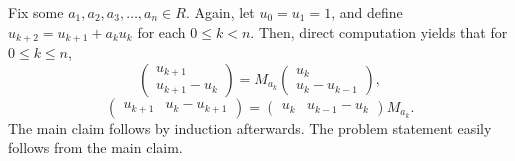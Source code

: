 \documentclass{article}
\begin{document}
Fix some $a_1, a_2, a_3, \ldots, a_n \in R$.
Again, let $u_0 = u_1 = 1$, and define $u_{k + 2} = u_{k + 1} + a_k u_k$ for each $0 \leq k < n$.
Then, direct computation yields that for $0 \leq k \leq n$,
\[ \begin{pmatrix} u_{k + 1} \\ u_{k + 1} - u_k \end{pmatrix} = M_{a_k} \begin{pmatrix} u_k \\ u_k - u_{k - 1} \end{pmatrix}, \]
\[ \begin{pmatrix} u_{k + 1} & u_k - u_{k + 1} \end{pmatrix} = \begin{pmatrix} u_k & u_{k - 1} - u_k \end{pmatrix} M_{a_k}. \]
The main claim follows by induction afterwards.
The problem statement easily follows from the main claim.
\end{document}
